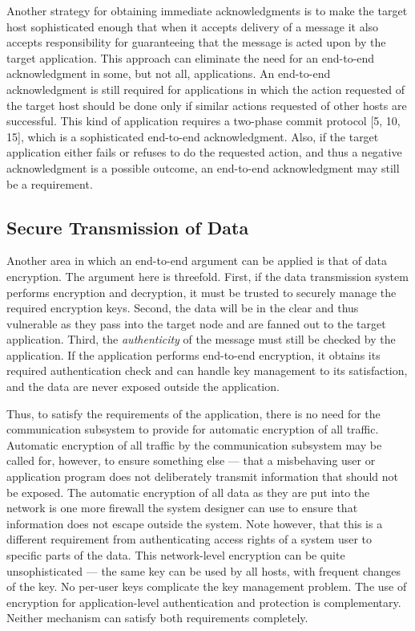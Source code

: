 \documentclass[a4paper,12pt,notitlepage,twoside,openright]{article}
\begin{document}
Another strategy for obtaining immediate acknowledgments is to make the
target host sophisticated enough that when it accepts delivery of a
message it also accepts responsibility for guaranteeing that the message
is acted upon by the target application. This approach can eliminate the
need for an end-to-end acknowledgment in some, but not all,
applications. An end-to-end acknowledgment is still required for
applications in which the action requested of the target host should be
done only if similar actions requested of other hosts are successful.
This kind of application requires a two-phase commit protocol {[}5, 10,
15{]}, which is a sophisticated end-to-end acknowledgment. Also, if the
target application either fails or refuses to do the requested action,
and thus a negative acknowledgment is a possible outcome, an end-to-end
acknowledgment may still be a requirement.

\hypertarget{secure-transmission-of-data}{%
\subsection{Secure Transmission of
Data}\label{secure-transmission-of-data}}

Another area in which an end-to-end argument can be applied is that of
data encryption. The argument here is threefold. First, if the data
transmission system performs encryption and decryption, it must be
trusted to securely manage the required encryption keys. Second, the
data will be in the clear and thus vulnerable
as they pass into the target node and are fanned out to the target
application. Third, the \emph{authenticity} of the message must still be
checked by the application. If the application performs end-to-end
encryption, it obtains its required authentication check and can handle
key management to its satisfaction, and the data are never exposed
outside the application.

Thus, to satisfy the requirements of the application, there is no need
for the communication subsystem to provide for automatic encryption of
all traffic. Automatic encryption of all traffic by the communication
subsystem may be called for, however, to ensure something else --- that a misbehaving user or application program does not deliberately
transmit information that should not be exposed. The automatic
encryption of all data as they are put into the network is one more
firewall the system designer can use to ensure that information does not
escape outside the system. Note however, that this is a different
requirement from authenticating access rights of a system user to
specific parts of the data. This network-level encryption can be quite
unsophisticated --- the same key can be used by all hosts, with
frequent changes of the key. No per-user keys complicate the key
management problem. The use of encryption for application-level
authentication and protection is complementary. Neither mechanism can
satisfy both requirements completely.
\end{document}
